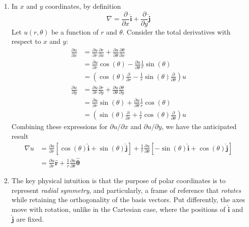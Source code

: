\documentclass[a4paper]{article}
\begin{document}
\begin{enumerate}[label=(\alph*)]
\[	\]
	Now, we know that \( \pmb{\hat{r}} \) and \( \pmb{\hat{\theta}} \) must be spanning basis vectors, which is to say that we must have \( \pmb{\hat{r}} \perp \pmb{\hat{\theta}} \). We need only differentiate with respect to \( \theta \) to derive this orthogonal basis vector.
	\[
		\pmb{\hat{\theta}} = -\sin\!\left(\theta\right) \pmb{\hat{i}} + \cos\!\left(\theta\right) \pmb{\hat{j}} 
	\]
	\item In \( x \) and \( y \) coordinates, by definition
	\[
		\nabla = \frac{\partial }{\partial x}\pmb{\hat{i}} + \frac{\partial }{\partial y}\pmb{\hat{j}} 
	\]
	Let \( u \!\left( r,\theta \right) \) be a function of \( r \) and \( \theta \). Consider the total derivatives with respect to \( x \) and \( y \):
	\begin{align*}
		\frac{\partial u}{\partial x} & = \frac{\partial u}{\partial r}\frac{\partial r}{\partial x} + \frac{\partial u}{\partial \theta}\frac{\partial \theta}{\partial x} \\
		 			      & = \frac{\partial u}{\partial r}\cos\!\left(\theta\right) - \frac{\partial u}{\partial \theta}\frac{1}{r}\sin\!\left(\theta\right) \\ 
		 			      & = \!\left( \cos\!\left(\theta\right) \frac{\partial }{\partial r} - \frac{1}{r}\sin\!\left(\theta\right)\frac{\partial }{\partial \theta} \right)u \\
		\frac{\partial u}{\partial y} & = \frac{\partial u}{\partial r}\frac{\partial r}{\partial y} + \frac{\partial u}{\partial \theta}\frac{\partial \theta}{\partial y} \\
					      & = \frac{\partial u}{\partial r}\sin\!\left(\theta\right) + \frac{\partial u}{\partial \theta}\frac{1}{r}\cos\!\left(\theta\right) \\
					      & = \!\left( \sin\!\left(\theta\right) \frac{\partial }{\partial r} + \frac{1}{r}\cos\!\left(\theta\right) \frac{\partial }{\partial \theta} \right)u
	\end{align*}
	Combining these expressions for \( \partial u / \partial x \) and \( \partial u / \partial y \), we have the anticipated result
	\begin{align*}
		\nabla u & = \frac{\partial u}{\partial r} \!\left[ \cos\!\left(\theta\right) \pmb{\hat{i}} + \sin\!\left(\theta\right) \pmb{\hat{j}} \right] + \frac{1}{r}\frac{\partial u}{\partial \theta} \!\left[ -\sin\!\left(\theta\right) \pmb{\hat{i}} + \cos\!\left(\theta\right) \pmb{\hat{j}} \right] \\
			 & = \frac{\partial u}{\partial r}\pmb{\hat{r}} + \frac{1}{r}\frac{\partial u}{\partial \theta}\pmb{\hat{\theta}}
	\end{align*}
	\item The key physical intuition is that the purpose of polar coordinates is to represent \textit{radial symmetry}, and particularly, a frame of reference that \textit{rotates} while retaining the orthogonality of the basis vectors. Put differently, the axes move with rotation, unlike in the Cartesian case, where the positions of \( \pmb{\hat{i}} \) and \( \pmb{\hat{j}} \) are fixed.


\end{enumerate}
\end{document}
